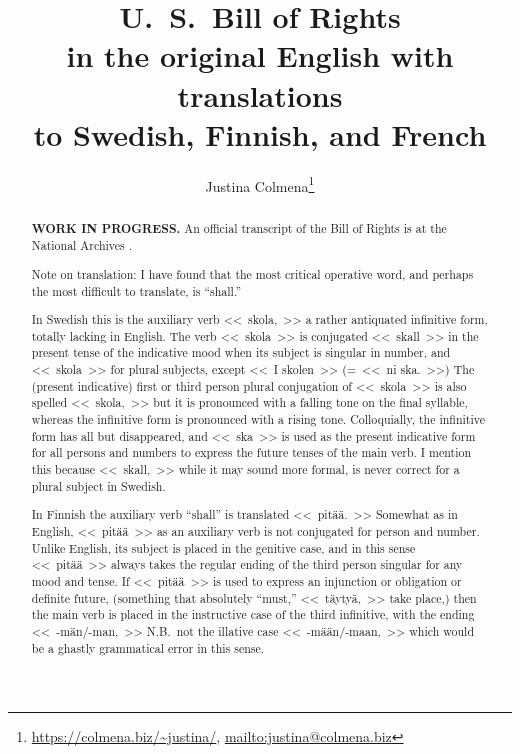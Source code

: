 \documentclass[a4paper,landscape,10pt]{article}
\title{{\huge \textbf{U.~S.\ Bill of Rights}}\\
	in the original English with translations\\
	to Swedish, Finnish, and French}
\author{Justina Colmena\footnote{\url{https://colmena.biz/~justina/}, \url{mailto:justina@colmena.biz}}}
\begin{document}
	
\sloppy
\maketitle
\begin{abstract}
	{\color{red}\textbf{WORK IN PROGRESS.}} An official transcript of the Bill of Rights is at the National Archives \cite{national-archives}.
	
	Note on translation:  I have found that the most critical operative word, and perhaps the most difficult to translate, is ``shall.''
	
	In Swedish this is the auxiliary verb \foreignlanguage{swedish}{<<~skola,~>>} a rather antiquated infinitive form, totally lacking in English.  The verb \foreignlanguage{swedish}{<<~skola~>>} is conjugated \foreignlanguage{swedish}{<<~skall~>>} in the present tense of the indicative mood when its subject is singular in number, and \foreignlanguage{swedish}{<<~skola~>>} for plural subjects, except \foreignlanguage{swedish}{<<~I skolen~>> (=~<<~ni ska.~>>)}  The (present indicative) first or third person plural conjugation of \foreignlanguage{swedish}{<<~skola~>>} is also spelled \foreignlanguage{swedish}{<<~skola,~>>} but it is pronounced with a falling tone on the final syllable, whereas the infinitive form is pronounced with a rising tone.  Colloquially, the infinitive form has all but disappeared, and \foreignlanguage{swedish}{<<~ska~>>} is used as the present indicative form for all persons and numbers to express the future tenses of the main verb.  I mention this because \foreignlanguage{swedish}{<<~skall,~>>} while it may sound more formal, is never correct for a plural subject in Swedish.
		
	In Finnish the auxiliary verb ``shall'' is translated \foreignlanguage{finnish}{<<~pitää.~>>}  Somewhat as in English, \foreignlanguage{finnish}{<<~pitää~>>} as an auxiliary verb is not conjugated for person and number.  Unlike English, its subject is placed in the genitive case, and in this sense \foreignlanguage{finnish}{<<~pitää~>>}  always takes the regular ending of the third person singular for any mood and tense.  If \foreignlanguage{finnish}{<<~pitää~>>} is used to express an injunction or obligation or definite future, (something that absolutely ``must,'' \foreignlanguage{finnish}{<<~täytyä,~>>} take place,) then the main verb is placed in the instructive case of the third infinitive, with the ending \foreignlanguage{finnish}{<<~\mbox{-män/-man,}~>>} N.B.\ not the illative case \foreignlanguage{finnish}{<<~\mbox{-mään/-maan,}~>>} which would be a ghastly grammatical error in this sense.


\end{abstract}
\end{document}
